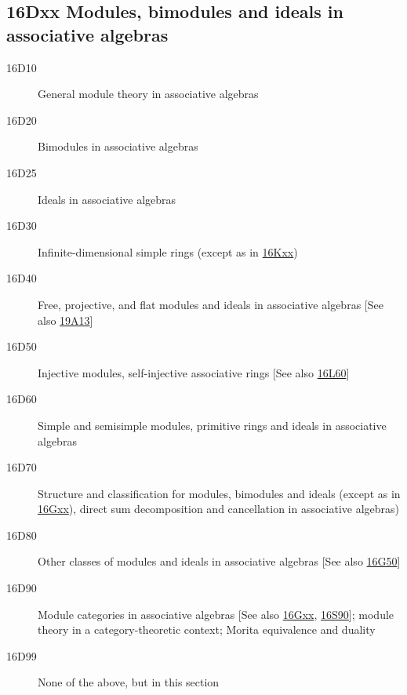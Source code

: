 \documentclass[letterpaper]{article}
\begin{document}
\subsection*{16Dxx  Modules, bimodules and ideals in associative algebras}\label{16Dxx}
\begin{description}  
\item [16D10]\label{16D10} General module theory in associative algebras
\item [16D20]\label{16D20} Bimodules in associative algebras
\item [16D25]\label{16D25} Ideals in associative algebras
\item [16D30]\label{16D30} Infinite-dimensional simple rings (except as in \hyperref[16Kxx]{16Kxx})
\item [16D40]\label{16D40} Free, projective, and flat modules and ideals in associative algebras [See also \hyperref[19A13]{19A13}]
\item [16D50]\label{16D50} Injective modules, self-injective associative rings [See also \hyperref[16L60]{16L60}]
\item [16D60]\label{16D60} Simple and semisimple modules, primitive rings and ideals in associative algebras
\item [16D70]\label{16D70} Structure and classification for modules, bimodules and ideals (except as in \hyperref[16Gxx]{16Gxx}), direct sum decomposition and cancellation in associative algebras)
\item [16D80]\label{16D80} Other classes of modules and ideals in associative algebras [See also \hyperref[16G50]{16G50}]
\item [16D90]\label{16D90} Module categories in associative algebras [See also \hyperref[16Gxx]{16Gxx}, \hyperref[16S90]{16S90}]; module theory in a category-theoretic context; Morita equivalence and duality
\item [16D99]\label{16D99} None of the above, but in this section
\end{description}
\end{document}
